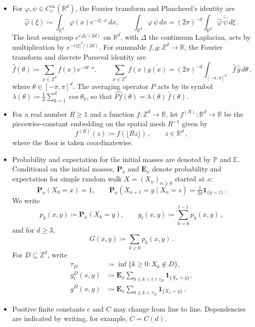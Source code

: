 \documentclass[11pt]{amsart}
\theoremstyle{plain}
\theoremstyle{definition}
\newcommand{\Z}{\mathbb{Z}}
\newcommand{\R}{\mathbb{R}}
\newcommand{\E}{\mathbb{E}}
\renewcommand{\P}{\mathbb{P}}
\newcommand{\one}{\mathbf{1}}
\begin{document}
\begin{itemize}
	\item For $\varphi,\psi\in C_c^\infty(\R^d)$, the Fourier transform and
	Plancherel's identity are
	\[
		\widehat\varphi(\xi)\coloneqq\int_{\R^d}\varphi(x)e^{-i\xi\cdot x}\,dx,\qquad
		\int_{\R^d}\varphi\,\overline{\psi}\,dx=(2\pi)^{-d}\int_{\R^d}\widehat\varphi\,\overline{\widehat\psi}\,d\xi\, .
	\]
	The heat semigroup $e^{r\Delta/(2d)}$ on $\R^d$, with $\Delta$ the continuum
	Laplacian, acts by multiplication by $e^{-r|\xi|^2/(2d)}$.
	For summable $f,g:\Z^d\to\R$, the Fourier transform and discrete Parseval
	identity are
	\[
		\widehat f(\theta)\coloneqq\sum_{x\in\Z^d}f(x)e^{-i\theta\cdot x},\qquad
		\sum_{x\in\Z^d}f(x)\overline{g(x)}=(2\pi)^{-d}\int_{[-\pi,\pi]^d}\widehat f\,\overline{\widehat g}\,d\theta\, ,
	\]
	where $\theta\in[-\pi,\pi]^d$. The averaging operator $P$ acts by its symbol
	$\lambda(\theta)\coloneqq\tfrac1d\sum_{k=1}^d\cos\theta_k$, so that
	$\widehat{Pf}(\theta)=\lambda(\theta)\,\widehat f(\theta)$.

	\item For a real number $R\geq1$ and a function $f:\Z^d\to\R$, let
	$f^{(R)}:\R^d\to\R$ be the piecewise-constant embedding on the spatial mesh
	$R^{-1}$ given by
	\[
		f^{(R)}(z)\coloneqq f(\lfloor Rz\rfloor)\, ,
		\qquad z\in\R^d\, ,
	\]
	where the floor is taken coordinatewise.

    \item Probability and expectation for the initial masses are denoted by
    $\P$ and $\E$. Conditional on the initial masses, $\mathbf P_x$ and
    $\mathbf E_x$ denote probability and expectation for simple random walk
    $X=(X_n)_{n\geq0}$ started at $x$:
    \begin{equation}\label{eq:random-walk-notation}
        \mathbf P_x(X_0=x)=1,\qquad
        \mathbf P_x(X_{n+1}=y\mid X_n=z)=\tfrac1{2d}\one_{\{y\sim z\}}\, .
    \end{equation}
    We write
    \[
        p_k(x,y)\coloneqq\mathbf P_x(X_k=y),\qquad
        g_t(x,y)\coloneqq\sum_{k=0}^{t-1}p_k(x,y)\, ,
    \]
    and for $d\geq 3$,
    \[
    G(x,y)\coloneqq\sum_{k\geq0}p_k(x,y)\, .
    \]
    For $D\subseteq\Z^d$, write
    \begin{equation}\label{eq:killed-walk-notation}
    \begin{aligned}
        \tau_D&\coloneqq\inf\{k\geq0:X_k\notin D\},\\
        g_t^D(x,y)&\coloneqq \mathbf E_x\sum_{0\leq k<t\wedge\tau_D}
        \one_{\{X_k=y\}},\\
        g^D(x,y)&\coloneqq \mathbf E_x\sum_{0\leq k<\tau_D}
        \one_{\{X_k=y\}}\, .
    \end{aligned}
    \end{equation}
    \item Positive finite constants $c$ and $C$ may change from line to line. Dependencies
    are indicated by writing, for example, $C=C(d)$.
\end{itemize}
\end{document}
